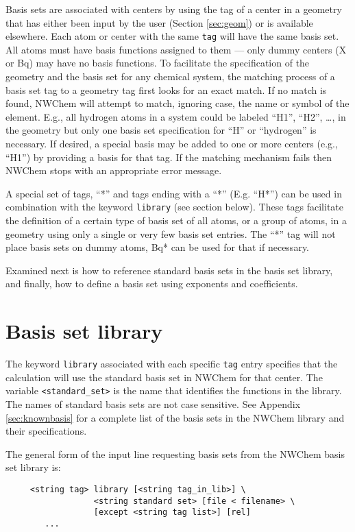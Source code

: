 Basis sets are associated with centers by using the tag of a center in
a geometry that has either been input by the user (Section
\ref{sec:geom}) or is available elsewhere.  Each atom or center with
the same \verb+tag+ will have the same basis set.  All atoms must have
basis functions assigned to them --- only dummy centers (X or Bq) may have no
basis functions.  To facilitate the specification of the geometry and
the basis set for any chemical system, the matching process of a basis
set tag to a geometry tag first looks for an exact match.  If no match
is found, NWChem will attempt to match, ignoring case, the name or
symbol of the element.  E.g., all hydrogen atoms in a system could be
labeled ``H1'', ``H2'', \ldots, in the geometry but only
one basis set specification for ``H'' or ``hydrogen'' is necessary.
If desired, a special basis may be added to one or more centers (e.g.,
``H1'') by providing a basis for that tag.
If the matching mechanism fails then NWChem stops with an appropriate
error message.

A special set of tags, ``*'' and tags ending with a ``*'' (E.g. ``H*'')
can be used in combination with the keyword \verb+library+ (see section
below). These tags facilitate the definition of a certain type of basis 
set of all atoms, or a group of atoms, in a geometry using only a single 
or very few basis set entries. The ``*'' tag will not place basis sets 
on dummy atoms, Bq* can be used for that if necessary. 

Examined next is how to reference standard basis sets in the basis set
library, and finally, how to define a basis set using exponents and
coefficients.

\section{Basis set library}

The keyword \verb+library+ associated with each specific \verb+tag+
entry specifies that the calculation will use the standard basis set
in NWChem for that center.  The variable \verb+<standard_set>+ is the
name that identifies the functions in the library.  The names of
standard basis sets are not case sensitive.  See Appendix
\ref{sec:knownbasis} for a complete list of the basis sets in the
NWChem library and their specifications.  

The general form of the input line requesting basis sets from the NWChem
basis set library is:
\begin{verbatim}
     <string tag> library [<string tag_in_lib>] \
                  <string standard set> [file < filename> \
                  [except <string tag list>] [rel]
        ...
\end{verbatim}

